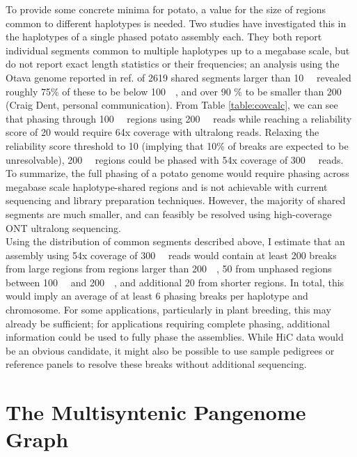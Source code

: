 To provide some concrete minima for potato, a value for the size of regions common to different haplotypes is needed.
Two studies have investigated this in the haplotypes of a single phased potato assembly each\cite{sun22, xiao26}. 
They both report individual segments common to multiple haplotypes up to a megabase scale, but do not report exact length statistics or their frequencies;
an analysis using the Otava genome reported in ref. \cite{sun22} of 2619 shared segments larger than \qty{10}{\kilo\bp} revealed roughly 75\% of these to be below \qty{100}{\kilo\bp}, and over 90 \% to be smaller than \qty{200}{\kilo\bp} (Craig Dent, personal communication). 
From Table \ref{table:covcalc}, we can see that phasing through \qty{100}{\kilo\bp} regions using \qty{200}{\kilo\bp} reads while reaching a reliability score of 20 would require 64x coverage with ultralong reads. 
Relaxing the reliability score threshold to 10 (implying that 10\% of breaks are expected to be unresolvable), \qty{200}{\kilo\bp} regions could be phased with 54x coverage of \qty{300}{\kilo\bp} reads.\\
To summarize, the full phasing of a potato genome would require phasing across megabase scale haplotype-shared regions and is not achievable with current sequencing and library preparation techniques. 
However, the majority of shared segments are much smaller, and can feasibly be resolved using high-coverage ONT ultralong sequencing.\\
Using the distribution of common segments described above, I estimate that an assembly using 54x coverage of \qty{300}{\kilo\bp} reads would contain at least 200 breaks from large regions from regions larger than \qty{200}{\kilo\bp}, 50 from unphased regions between \qty{100}{\kilo\bp} and \qty{200}{\kilo\bp}, and additional 20 from shorter regions.
In total, this would imply an average of at least 6 phasing breaks per haplotype and chromosome.
For some applications, particularly in plant breeding, this may already be sufficient; for applications requiring complete phasing, additional information could be used to fully phase the assemblies.
While HiC data would be an obvious candidate, it might also be possible to use sample pedigrees or reference panels to resolve these breaks without additional sequencing.


\section*{The Multisyntenic Pangenome Graph}

